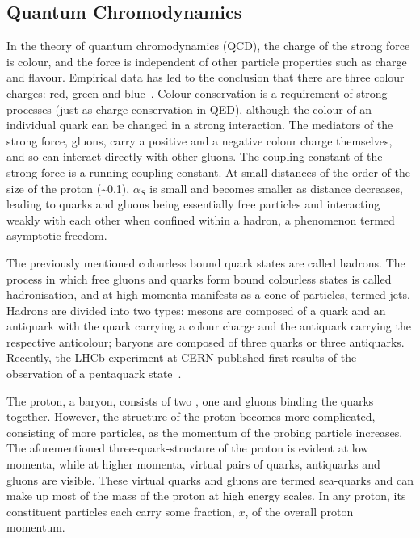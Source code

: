 \subsection{Quantum Chromodynamics}
\label{ss:quantum_chromodynamics}

In the theory of quantum chromodynamics (QCD), the charge of the strong force is colour, and the force is
independent of other particle properties such as charge and flavour. Empirical data has led to the conclusion
that there are three colour charges: red, green and blue~\cite{Griffiths:1987tj}. Colour conservation is a
requirement of strong processes (just as charge conservation in QED), although the colour of an individual
quark can be changed in a strong interaction. The mediators of the strong force, gluons, carry a positive and
a negative colour charge themselves, and so can interact directly with other gluons. The coupling constant of
the strong force is a running coupling constant. At small distances of the order of the size of the proton
(\textasciitilde 0.1\fm), $\alpha_{S}$ is small and becomes smaller as distance decreases, leading to quarks
and gluons being essentially free particles and interacting weakly with each other when confined within a hadron,
a phenomenon termed asymptotic freedom.

The previously mentioned colourless bound quark states are called hadrons. The process in which free gluons
and quarks form bound colourless states is called hadronisation, and at high momenta manifests as a cone of
particles, termed jets. Hadrons are divided into two types: mesons are composed of a quark and an antiquark
with the quark carrying a colour charge and the antiquark carrying the respective anticolour; baryons are
composed of three quarks or three antiquarks. Recently, the LHCb experiment at CERN published first results of
the observation of a pentaquark state~\cite{Aaij:2015tga}.

The proton, a baryon, consists of two \uquarks, one \dquark and gluons binding the quarks together. However,
the structure of the proton becomes more complicated, consisting of more particles, as the momentum of the
probing particle increases. The aforementioned three-quark-structure of the proton is evident at low momenta,
while at higher momenta, virtual pairs of quarks, antiquarks and gluons are visible. These virtual quarks and
gluons are termed sea-quarks and can make up most of the mass of the proton at high energy scales. In any
proton, its constituent particles each carry some fraction, $x$, of the overall proton momentum. %

